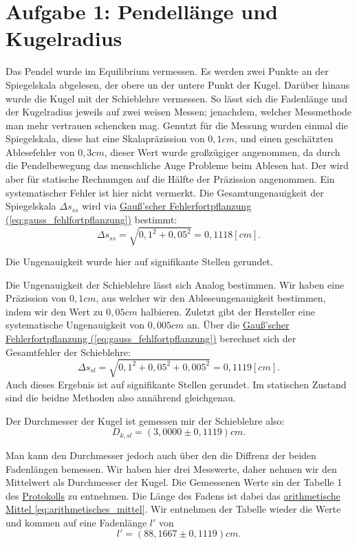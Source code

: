 \twocolumn

\section{Aufgabe 1: Pendellänge und Kugelradius}
Das Pendel wurde im Equilibrium vermessen. Es werden zwei Punkte an der Spiegelskala abgelesen, der obere un der untere Punkt der Kugel. Darüber hinaus wurde die Kugel mit der Schieblehre vermessen. So lässt sich die Fadenlänge und der Kugelradius jeweils auf zwei weisen Messen; jenachdem, welcher Messmethode man mehr vertrauen schencken mag.
Genutzt für die Messung wurden einmal die Spiegelskala, diese hat eine Skalapräzission von $0,1cm$, und einen geschätzten Ablesefehler von $0,3cm$, dieser Wert wurde großzügiger angenommen, da durch die Pendelbewegung das menschliche Auge Probleme beim Ablesen hat. Der wird aber für statische Rechnungen auf die Hälfte der Präzission angenommen. Ein systematischer Fehler ist hier nicht vermerkt. Die Gesamtungenauigkeit der Spiegelskala $\Delta s_{ss}$ wird via \hyperref[eq:gauss_fehlfortpflanzung]{Gauß'scher Fehlerfortpflanzung (\ref*{eq:gauss_fehlfortpflanzung})} bestimmt:
\begin{equation}
    \Delta s_{ss} = \sqrt{0,1^2+0,05^2} = 0,1118 [cm].
\end{equation}

Die Ungenauigkeit wurde hier auf signifikante Stellen gerundet.

Die Ungenauigkeit der Schieblehre lässt sich Analog bestimmen. Wir haben eine Präzission von $0,1cm$, aus welcher wir den Ableseungenauigkeit bestimmen, indem wir den Wert zu $0,05cm$ halbieren. Zuletzt gibt der Hersteller eine systematische Ungenauigkeit von $0,005cm$ an. Über die \hyperref[eq:gauss_fehlfortpflanzung]{Gauß'scher Fehlerfortpflanzung (\ref*{eq:gauss_fehlfortpflanzung})} berechnet sich der Gesamtfehler der Schieblehre:
\begin{equation}
    \Delta s_{sl} = \sqrt{0,1^2+0,05^2+0,005^2} = 0,1119 [cm].
\end{equation}
Auch dieses Ergebnis ist auf signifikante Stellen gerundet. Im statischen Zustand sind die beidne Methoden also annährend gleichgenau.

Der Durchmesser der Kugel ist gemessen mir der Schieblehre also:
\begin{equation}
    D_{k,sl} = (3,0000 \pm 0,1119)cm.
\end{equation}

Man kann den Durchmesser jedoch auch über den die Diffrenz der beiden Fadenlängen bemessen. Wir haben hier drei Messwerte, daher nehmen wir den Mittelwert als Durchmesser der Kugel. Die Gemessenen Werte sin der Tabelle 1 des \hyperref[Protokoll]{Protokolls} zu entnehmen. Die Länge des Fadens ist dabei das \hyperref[eq:arithmetisches_mittel]{arithmetische Mittel \ref*{eq:arithmetisches_mittel}}. Wir entnehmen der Tabelle wieder die Werte und kommen auf eine Fadenlänge $l'$ von
\begin{equation}
    l' = (88,1667 \pm 0,1119) cm.
\end{equation}

